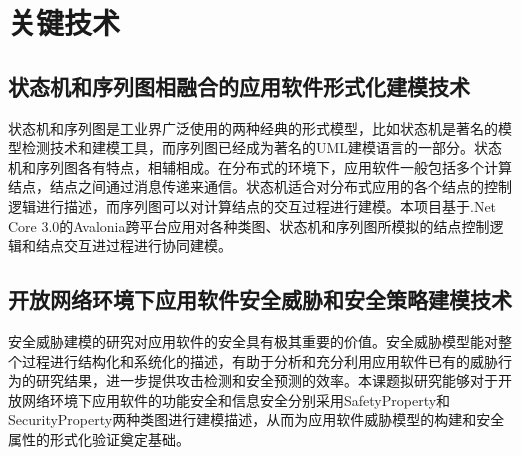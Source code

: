 \chapter{关键技术}
\section{状态机和序列图相融合的应用软件形式化建模技术}
状态机和序列图是工业界广泛使用的两种经典的形式模型，比如状态机是著名的模型检测技术和建模工具，而序列图已经成为著名的UML建模语言的一部分。状态机和序列图各有特点，相辅相成。在分布式的环境下，应用软件一般包括多个计算结点，结点之间通过消息传递来通信。状态机适合对分布式应用的各个结点的控制逻辑进行描述，而序列图可以对计算结点的交互过程进行建模。本项目基于.Net Core 3.0的Avalonia跨平台应用对各种类图、状态机和序列图所模拟的结点控制逻辑和结点交互进过程进行协同建模。
\section{开放网络环境下应用软件安全威胁和安全策略建模技术}
安全威胁建模的研究对应用软件的安全具有极其重要的价值。安全威胁模型能对整个过程进行结构化和系统化的描述，有助于分析和充分利用应用软件已有的威胁行为的研究结果，进一步提供攻击检测和安全预测的效率。本课题拟研究能够对于开放网络环境下应用软件的功能安全和信息安全分别采用SafetyProperty和SecurityProperty两种类图进行建模描述，从而为应用软件威胁模型的构建和安全属性的形式化验证奠定基础。